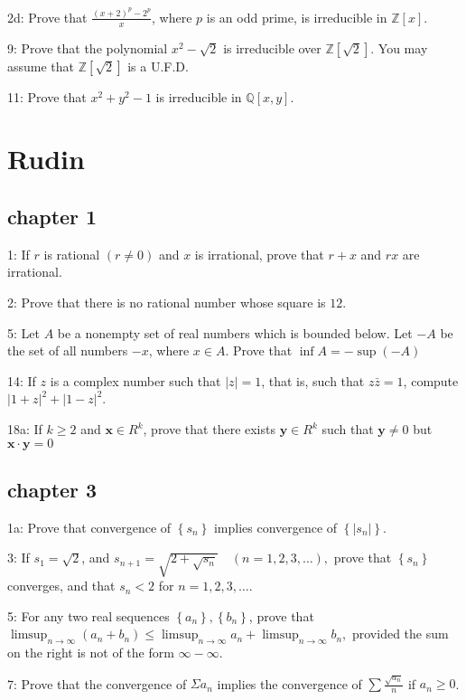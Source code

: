 \documentclass{article}
\begin{document}
2d: Prove that $\frac{(x+2)^p-2^p}{x}$, where $p$ is an odd prime, is irreducible in $\mathbb{Z}[x]$. 

9: Prove that the polynomial $x^{2}-\sqrt{2}$ is irreducible over $\mathbb{Z}[\sqrt{2}]$. You may assume that $\mathbb{Z}[\sqrt{2}]$ is a U.F.D. 

11: Prove that $x^2+y^2-1$ is irreducible in $\mathbb{Q}[x,y]$. 
\section*{Rudin}
\subsection*{chapter 1}
1: If $r$ is rational $(r \neq 0)$ and $x$ is irrational, prove that $r+x$ and $r x$ are irrational.

2: Prove that there is no rational number whose square is $12$. 

5: Let $A$ be a nonempty set of real numbers which is bounded below. Let $-A$ be the set of all numbers $-x$, where $x \in A$. Prove that $\inf A=-\sup (-A)$

14: If $z$ is a complex number such that $|z|=1$, that is, such that $z \bar{z}=1$, compute $|1+z|^{2}+|1-z|^{2}$. 

18a: If $k \geq 2$ and $\mathbf{x} \in R^{k}$, prove that there exists $\mathbf{y} \in R^{k}$ such that $\mathbf{y} \neq 0$ but $\mathbf{x} \cdot \mathbf{y}=0$

\subsection*{chapter 3}
1a: Prove that convergence of $\left\{s_{n}\right\}$ implies convergence of $\left\{\left|s_{n}\right|\right\}$. 

3: If $s_{1}=\sqrt{2}$, and $s_{n+1}=\sqrt{2+\sqrt{s_{n}}} \quad(n=1,2,3, \ldots),$ prove that $\left\{s_{n}\right\}$ converges, and that $s_{n}<2$ for $n=1,2,3, \ldots$.

5: For any two real sequences $\left\{a_{n}\right\},\left\{b_{n}\right\}$, prove that $\limsup _{n \rightarrow \infty}\left(a_{n}+b_{n}\right) \leq \limsup _{n \rightarrow \infty} a_{n}+\limsup _{n \rightarrow \infty} b_{n},$ provided the sum on the right is not of the form $\infty-\infty$.

7: Prove that the convergence of $\Sigma a_{n}$ implies the convergence of $\sum \frac{\sqrt{a_{n}}}{n}$ if $a_n\geq 0$.
\end{document}
